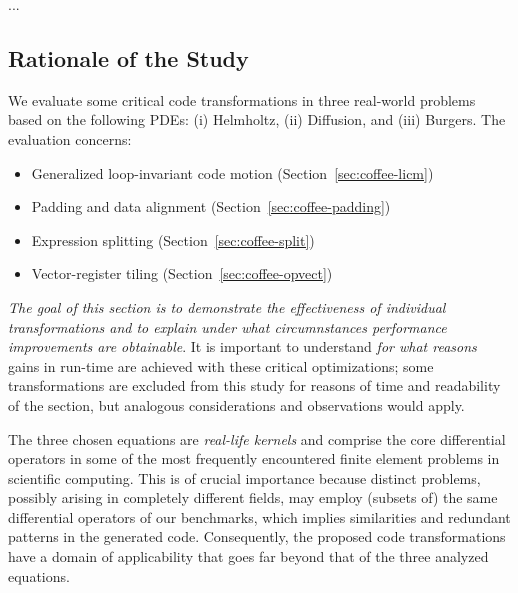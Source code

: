 ...

\subsection{Rationale of the Study}
\label{sec:coffee-individual-rationale}
We evaluate some critical code transformations in three real-world problems based on the following PDEs: (i) Helmholtz, (ii) Diffusion, and (iii) Burgers. The evaluation concerns:
\begin{itemize}
\item Generalized loop-invariant code motion (Section~\ref{sec:coffee-licm})
\item Padding and data alignment (Section~\ref{sec:coffee-padding})
\item Expression splitting (Section~\ref{sec:coffee-split})
\item Vector-register tiling (Section~\ref{sec:coffee-opvect})
\end{itemize}
\textit{The goal of this section is to demonstrate the effectiveness of individual transformations and to explain under what circumnstances performance improvements are obtainable}. It is important to understand \textit{for what reasons} gains in run-time are achieved with these critical optimizations; some transformations are excluded from this study for reasons of time and readability of the section, but analogous considerations and observations would apply. 

The three chosen equations are \emph{real-life kernels} and comprise the core differential operators in some of the most frequently encountered finite element problems in scientific computing. This is of crucial importance because distinct problems, possibly arising in completely different fields, may employ (subsets of) the same differential operators of our benchmarks, which implies similarities and redundant patterns in the generated code. Consequently, the proposed code transformations have a domain of applicability that goes far beyond that of the three analyzed equations.

